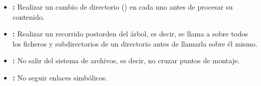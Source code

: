 \begin{itemize}
	\item{}\textbf{:} Realizar un cambio de directorio () en cada uno antes de procesar su contenido.
	\item{}\textbf{:} Realizar un recorrido postorden del árbol, es decir, se llama a  sobre todos los ficheros y subdirectorios de un directorio antes de llamarla sobre él mismo.
	\item{}\textbf{:} No salir del sistema de archivos, es decir, no cruzar puntos de montaje.
	\item{}\textbf{:} No seguir enlaces simbólicos.
\end{itemize}

\begin{lstlisting}[language=C]
\end{lstlisting}
\begin{lstlisting}[language=C]
\end{lstlisting}
